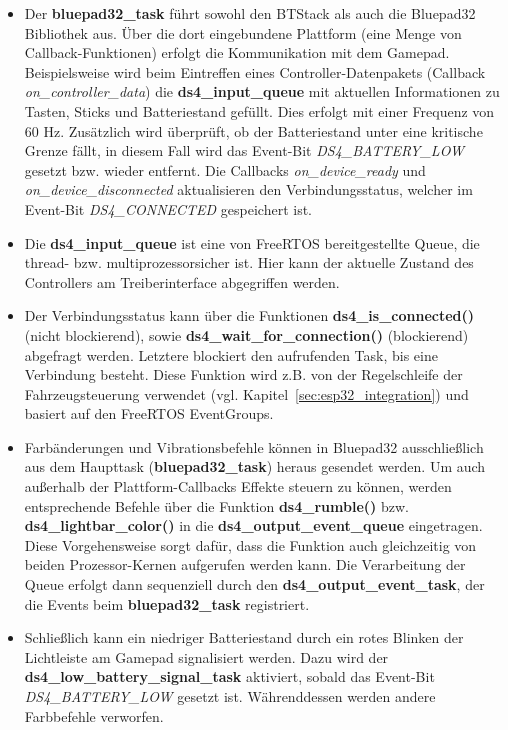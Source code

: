 \begin{itemize}
    \item Der \textbf{bluepad32\_task} führt sowohl den BTStack als auch die Bluepad32 Bibliothek aus. 
    Über die dort eingebundene Plattform (eine Menge von Callback-Funktionen) erfolgt die Kommunikation mit dem Gamepad. 
    Beispielsweise wird beim Eintreffen eines Controller-Datenpakets (Callback \textit{on\_controller\_data}) die \textbf{ds4\_input\_queue} mit aktuellen Informationen zu Tasten, Sticks und Batteriestand gefüllt.
    Dies erfolgt mit einer Frequenz von 60 Hz. 
    Zusätzlich wird überprüft, ob der Batteriestand unter eine kritische Grenze fällt, in diesem Fall wird das Event-Bit \textit{DS4\_BATTERY\_LOW} gesetzt bzw. wieder entfernt. 
    Die Callbacks \textit{on\_device\_ready} und \textit{on\_device\_disconnected} aktualisieren den Verbindungsstatus, welcher im Event-Bit \textit{DS4\_CONNECTED} gespeichert ist.
     
    \item Die \textbf{ds4\_input\_queue} ist eine von FreeRTOS bereitgestellte Queue, die thread- bzw. multiprozessorsicher ist.
    Hier kann der aktuelle Zustand des Controllers am Treiberinterface abgegriffen werden.

    \item Der Verbindungsstatus kann über die Funktionen \textbf{ds4\_is\_connected()} (nicht blockierend), sowie \textbf{ds4\_wait\_for\_connection()} (blockierend) abgefragt werden. 
    Letztere blockiert den aufrufenden Task, bis eine Verbindung besteht. 
    Diese Funktion wird z.B. von der Regelschleife der Fahrzeugsteuerung verwendet (vgl. Kapitel~\ref{sec:esp32_integration}) und basiert auf den FreeRTOS EventGroups.

    \item Farbänderungen und Vibrationsbefehle können in Bluepad32 ausschließlich aus dem Haupttask (\textbf{bluepad32\_task}) heraus gesendet werden. 
    Um auch außerhalb der Plattform-Callbacks Effekte steuern zu können, werden entsprechende Befehle über die Funktion \textbf{ds4\_rumble()} bzw. \textbf{ds4\_lightbar\_color()} in die \textbf{ds4\_output\_event\_queue} eingetragen.
    Diese Vorgehensweise sorgt dafür, dass die Funktion auch gleichzeitig von beiden Prozessor-Kernen aufgerufen werden kann.
    Die Verarbeitung der Queue erfolgt dann sequenziell durch den \textbf{ds4\_output\_event\_task}, der die Events beim \textbf{bluepad32\_task} registriert.

    \item Schließlich kann ein niedriger Batteriestand durch ein rotes Blinken der Lichtleiste am Gamepad signalisiert werden. Dazu wird der \textbf{ds4\_low\_battery\_signal\_task} aktiviert, sobald das Event-Bit \textit{DS4\_BATTERY\_LOW} gesetzt ist. 
    Währenddessen werden andere Farbbefehle verworfen.
\end{itemize}

